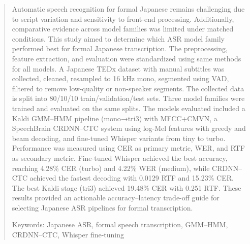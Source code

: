 \begin{abstract}

Automatic speech recognition for formal Japanese remains challenging due to script variation and sensitivity to front-end processing. Additionally, comparative evidence across model families was limited under matched conditions. This study aimed to determine which ASR model family performed best for formal Japanese transcription. The preprocessing, feature extraction, and evaluation were standardized using same methods for all models. A Japanese TEDx dataset with manual subtitles was collected, cleaned, resampled to 16 kHz mono, segmented using VAD, filtered to remove low-quality or non-speaker segments. The collected data is split into 80/10/10 train/validation/test sets. Three model families were trained and evaluated on the same splits. The models evaluated included a Kaldi GMM–HMM pipeline (mono→tri3) with MFCC+CMVN, a SpeechBrain CRDNN–CTC system using log-Mel features with greedy and beam decoding, and fine-tuned Whisper variants from tiny to turbo. Performance was measured using CER as primary metric, WER, and RTF as secondary metric. Fine-tuned Whisper achieved the best accuracy, reaching 4.28\% CER (turbo) and 4.22\% WER (medium), while CRDNN–CTC achieved the fastest decoding with 0.0129 RTF and 15.23\% CER. The best Kaldi stage (tri3) achieved 19.48\% CER with 0.251 RTF. These results provided an actionable accuracy–latency trade-off guide for selecting Japanese ASR pipelines for formal transcription.

\vspace{1em}
Keywords: Japanese ASR, formal speech transcription, GMM–HMM, CRDNN–CTC, Whisper fine-tuning
\end{abstract}
